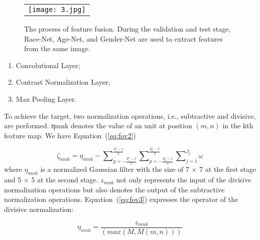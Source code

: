 \documentclass[12pt]{spieman}  %
\begin{document}
\begin{spacing}{2}
\begin{figure}
\begin{center}
\begin{tabular}{c}
\texttt{[image: 3.jpg]}
\end{tabular}
\end{center}
\caption 
{ \label{fig:example3}
The process of feature fusion. During the validation and test stage, Race-Net, Age-Net, and Gender-Net are used to extract features from the same image. } 
\end{figure} 

\begin{enumerate}
\item Convolutional Layer;
\item Contrast Normalization Layer;
\item Max Pooling Layer.
\end{enumerate}

To achieve the target, two normalization operations, i.e., subtractive and divisive, are performed. ηmnk denotes the value of an unit at position $(m, n)$ in the kth feature map. We have Equation~(\ref{eq:fov2})

\begin{equation}
\label{eq:fov2}
\zeta_{mnk}= \eta_{mnk}-\sum\nolimits_{p=-\frac{P_{i}-1}{2}}^{\frac{P_{i}-1}{2}}\sum\nolimits_{p=-\frac{Q_{i}-1}{2}}^{\frac{Q_{i}-1}{2}}\sum\nolimits_{j=1}^{J_{j}}\omega\,
\end{equation}
where $\eta_{mnk}$ is a normalized Gaussian filter with the size of 7 × 7 at the first stage and 5 × 5 at the second stage. $z_{mnk}$ not only represents the input of the divisive normalization operations but also denotes the output of the subtractive normalization operations. Equation~(\ref{eq:fov3}) expresses the operator of the divisive normalization: 

\begin{equation}
\label{eq:fov3}
\eta_{mnk}=\frac{z_{mnk}}{(max(M,M(m,n)))}\,
\end{equation}


\end{spacing}
\end{document}
